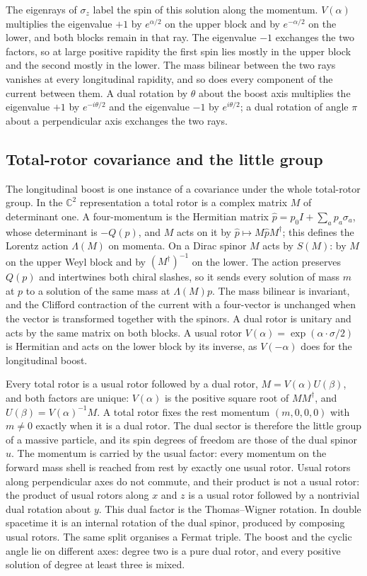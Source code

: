 \documentclass[a4paper]{article}
\begin{document}
The eigenrays of $\sigma_z$ label the spin of this solution along the momentum. $V(\alpha)$ multiplies the eigenvalue $+1$ by $e^{\alpha/2}$ on the upper block and by $e^{-\alpha/2}$ on the lower, and both blocks remain in that ray. The eigenvalue $-1$ exchanges the two factors, so at large positive rapidity the first spin lies mostly in the upper block and the second mostly in the lower. The mass bilinear between the two rays vanishes at every longitudinal rapidity, and so does every component of the current between them. A dual rotation by $\theta$ about the boost axis multiplies the eigenvalue $+1$ by $e^{-i\theta/2}$ and the eigenvalue $-1$ by $e^{i\theta/2}$; a dual rotation of angle $\pi$ about a perpendicular axis exchanges the two rays.

\subsection{Total-rotor covariance and the little group}

The longitudinal boost is one instance of a covariance under the whole total-rotor group. In the $\mathbb{C}^2$ representation a total rotor is a complex matrix $M$ of determinant one. A four-momentum is the Hermitian matrix $\hat p=p_0I+\sum_a p_a\sigma_a$, whose determinant is $-Q(p)$, and $M$ acts on it by $\hat p\mapsto M\hat pM^\dagger$; this defines the Lorentz action $\Lambda(M)$ on momenta. On a Dirac spinor $M$ acts by $S(M)$: by $M$ on the upper Weyl block and by $(M^\dagger)^{-1}$ on the lower. The action preserves $Q(p)$ and intertwines both chiral slashes, so it sends every solution of mass $m$ at $p$ to a solution of the same mass at $\Lambda(M)p$. The mass bilinear is invariant, and the Clifford contraction of the current with a four-vector is unchanged when the vector is transformed together with the spinors. A dual rotor is unitary and acts by the same matrix on both blocks. A usual rotor $V(\alpha)=\exp(\alpha\cdot\sigma/2)$ is Hermitian and acts on the lower block by its inverse, as $V(-\alpha)$ does for the longitudinal boost.

Every total rotor is a usual rotor followed by a dual rotor, $M=V(\alpha)U(\beta)$, and both factors are unique: $V(\alpha)$ is the positive square root of $MM^\dagger$, and $U(\beta)=V(\alpha)^{-1}M$. A total rotor fixes the rest momentum $(m,0,0,0)$ with $m\neq 0$ exactly when it is a dual rotor. The dual sector is therefore the little group of a massive particle, and its spin degrees of freedom are those of the dual spinor $u$. The momentum is carried by the usual factor: every momentum on the forward mass shell is reached from rest by exactly one usual rotor. Usual rotors along perpendicular axes do not commute, and their product is not a usual rotor: the product of usual rotors along $x$ and $z$ is a usual rotor followed by a nontrivial dual rotation about $y$. This dual factor is the Thomas--Wigner rotation. In double spacetime it is an internal rotation of the dual spinor, produced by composing usual rotors. The same split organises a Fermat triple. The boost and the cyclic angle lie on different axes: degree two is a pure dual rotor, and every positive solution of degree at least three is mixed.
\end{document}
